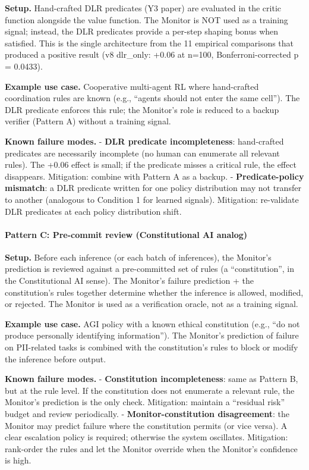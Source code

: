 \documentclass[11pt]{article}
\begin{document}
\textbf{Setup.} Hand-crafted DLR predicates (Y3 paper) are evaluated in
the critic function alongside the value function. The Monitor is NOT
used as a training signal; instead, the DLR predicates provide a
per-step shaping bonus when satisfied. This is the single architecture
from the 11 empirical comparisons that produced a positive result (v8
dlr\_only: +0.06 at n=100, Bonferroni-corrected p = 0.0433).

\textbf{Example use case.} Cooperative multi-agent RL where hand-crafted
coordination rules are known (e.g., ``agents should not enter the same
cell''). The DLR predicate enforces this rule; the Monitor's role is
reduced to a backup verifier (Pattern A) without a training signal.

\textbf{Known failure modes.} - \textbf{DLR predicate incompleteness}:
hand-crafted predicates are necessarily incomplete (no human can
enumerate all relevant rules). The +0.06 effect is small; if the
predicate misses a critical rule, the effect disappears. Mitigation:
combine with Pattern A as a backup. - \textbf{Predicate-policy
mismatch}: a DLR predicate written for one policy distribution may not
transfer to another (analogous to Condition 1 for learned signals).
Mitigation: re-validate DLR predicates at each policy distribution
shift.

\paragraph{Pattern C: Pre-commit review (Constitutional AI
analog)}\label{pattern-c-pre-commit-review-constitutional-ai-analog}

\textbf{Setup.} Before each inference (or each batch of inferences), the
Monitor's prediction is reviewed against a pre-committed set of rules (a
``constitution'', in the Constitutional AI sense). The Monitor's failure
prediction + the constitution's rules together determine whether the
inference is allowed, modified, or rejected. The Monitor is used as a
verification oracle, not as a training signal.

\textbf{Example use case.} AGI policy with a known ethical constitution
(e.g., ``do not produce personally identifying information''). The
Monitor's prediction of failure on PII-related tasks is combined with
the constitution's rules to block or modify the inference before output.

\textbf{Known failure modes.} - \textbf{Constitution incompleteness}:
same as Pattern B, but at the rule level. If the constitution does not
enumerate a relevant rule, the Monitor's prediction is the only check.
Mitigation: maintain a ``residual risk'' budget and review periodically.
- \textbf{Monitor-constitution disagreement}: the Monitor may predict
failure where the constitution permits (or vice versa). A clear
escalation policy is required; otherwise the system oscillates.
Mitigation: rank-order the rules and let the Monitor override when the
Monitor's confidence is high.
\end{document}
